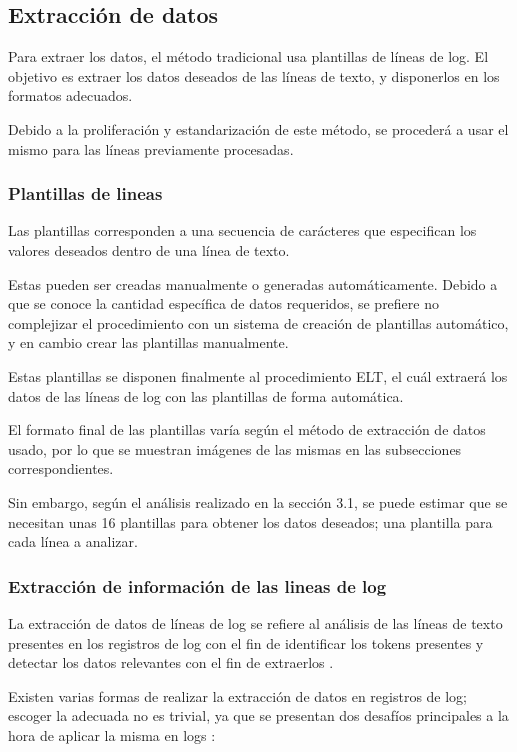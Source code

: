 \subsection{Extracción de datos}

Para extraer los datos, el método tradicional usa plantillas de líneas de log. El objetivo es extraer los datos deseados de las líneas de texto, y disponerlos en los formatos adecuados.

Debido a la proliferación y estandarización de este método, se procederá a usar el mismo para las líneas previamente procesadas.

\subsubsection{Plantillas de lineas}

Las plantillas corresponden a una secuencia de carácteres que especifican los valores deseados dentro de una línea de texto.

Estas pueden ser creadas manualmente o generadas automáticamente. Debido a que se conoce la cantidad específica de datos requeridos, se prefiere no complejizar el procedimiento con un sistema de creación de plantillas automático, y en cambio crear las plantillas manualmente.

Estas plantillas se disponen finalmente al procedimiento ELT, el cuál extraerá los datos de las líneas de log con las plantillas de forma automática.

El formato final de las plantillas varía según el método de extracción de datos usado, por lo que se muestran imágenes de las mismas en las subsecciones correspondientes.

Sin embargo, según el análisis realizado en la sección 3.1, se puede estimar que se necesitan unas 16 plantillas para obtener los datos deseados; una plantilla para cada línea a analizar.

\subsubsection{Extracción de información de las lineas de log}

La extracción de datos de líneas de log se refiere al análisis de las líneas de texto presentes en los registros de log con el fin de identificar los tokens presentes y detectar los datos relevantes con el fin de extraerlos \cite{jayathilake2011mind}. 

Existen varias formas de realizar la extracción de datos en registros de log; escoger la adecuada no es trivial, ya que se presentan dos desafíos principales a la hora de aplicar la misma en logs \cite{jayathilake2011mind}:

